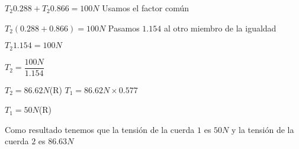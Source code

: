 \documentclass{article}
\begin{document}
$T_2 0.288 + T_2 0.866 = 100 N$\newline\newline
Usamos el factor com\'un\newline

$T_2 ( 0.288 + 0.866 ) = 100 N$\newline\newline
Pasamos $1.154$ al otro miembro de la igualdad\newline

$T_2 1.154 = 100 N$\newline

$T_2 = \dfrac{100 N}{1.154}$\newline

$T_2 = 86.62 N$\qquad (R)\newline\newline
$T_1 = 86.62 N \times 0.577$\newline

$T_1 = 50 N$\qquad (R)\newline

Como resultado tenemos que la tensi\'on de la cuerda $1$ es $50 N$ y la tensi\'on de la cuerda $2$ es $86.63 N$
\end{document}
